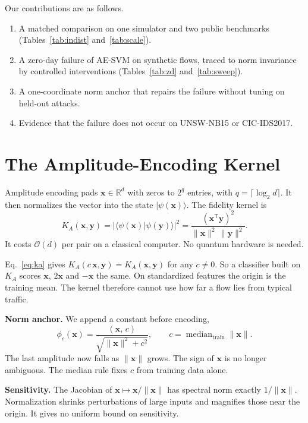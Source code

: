 \documentclass[conference,10pt]{IEEEtran}
\begin{document}
Our contributions are as follows.
\begin{enumerate}
\item A matched comparison on one simulator and two public benchmarks
  (Tables~\ref{tab:indist} and~\ref{tab:scale}).
\item A zero-day failure of AE-SVM on synthetic flows, traced to norm invariance
  by controlled interventions (Tables~\ref{tab:zd} and~\ref{tab:sweep}).
\item A one-coordinate norm anchor that repairs the failure without tuning on
  held-out attacks.
\item Evidence that the failure does not occur on UNSW-NB15 or CIC-IDS2017.
\end{enumerate}

\section{The Amplitude-Encoding Kernel}
\label{sec:method}

Amplitude encoding pads $\mathbf{x}\in\mathbb{R}^d$ with zeros to $2^q$ entries,
with $q=\lceil\log_2 d\rceil$. It then normalizes the vector into the state
$|\psi(\mathbf{x})\rangle$. The fidelity kernel is
\begin{equation}
K_A(\mathbf{x},\mathbf{y}) = |\langle\psi(\mathbf{x})|\psi(\mathbf{y})\rangle|^2
= \frac{(\mathbf{x}^{\mathsf{T}}\mathbf{y})^2}{\|\mathbf{x}\|^2\,\|\mathbf{y}\|^2}.
\label{eq:ka}
\end{equation}
It costs $\mathcal{O}(d)$ per pair on a classical computer. No quantum hardware
is needed.

Eq.~\eqref{eq:ka} gives $K_A(c\,\mathbf{x},\mathbf{y})=K_A(\mathbf{x},\mathbf{y})$ for any
$c\neq0$. So a classifier built on $K_A$ scores $\mathbf{x}$, $2\mathbf{x}$ and
$-\mathbf{x}$ the same. On standardized features the origin is the training
mean. The kernel therefore cannot use how far a flow lies from typical traffic.

\textbf{Norm anchor.} We append a constant before encoding,
\begin{equation}
\phi_c(\mathbf{x}) = \frac{(\mathbf{x},\,c)}{\sqrt{\|\mathbf{x}\|^2+c^2}},
\qquad c = \operatorname{median}_{\mathrm{train}} \|\mathbf{x}\| .
\label{eq:anchor}
\end{equation}
The last amplitude now falls as $\|\mathbf{x}\|$ grows. The sign of $\mathbf{x}$ is
no longer ambiguous. The median rule fixes $c$ from training data alone.

\textbf{Sensitivity.} The Jacobian of $\mathbf{x}\mapsto\mathbf{x}/\|\mathbf{x}\|$ has
spectral norm exactly $1/\|\mathbf{x}\|$. Normalization shrinks perturbations of
large inputs and magnifies those near the origin. It gives no uniform bound on
sensitivity.
\end{document}
